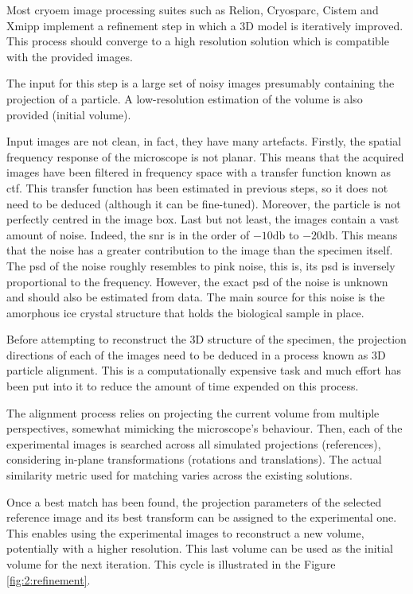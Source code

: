 \documentclass[../main.tex]{subfiles}
\begin{document}
Most \gls{cryoem} image processing suites such as Relion\cite{scheres2021}, Cryosparc\cite{cryosparc}, Cistem\cite{grigorieff2018} and Xmipp\cite{sorzano2021} implement a refinement step in which a 3D model is iteratively improved. This process should converge to a high resolution solution which is compatible with the provided images. 

The input for this step is a large set of noisy images presumably containing the projection of a particle. A low-resolution estimation of the volume is also provided (initial volume)\cite{sorzano2017b}.

Input images are not clean, in fact, they have many artefacts. Firstly, the spatial frequency response of the microscope is not planar. This means that the acquired images have been filtered in frequency space with a transfer function known as \gls{ctf}. This transfer function has been estimated in previous steps, so it does not need to be deduced (although it can be fine-tuned). Moreover, the particle is not perfectly centred in the image box. Last but not least, the images contain a vast amount of noise. Indeed, the \gls{snr} is in the order of $-10 \si{\decibel}$ to $-20 \si{\decibel}$\cite{sorzano2022}. This means that the noise has a greater contribution to the image than the specimen itself. The \gls{psd} of the noise roughly resembles to pink noise, this is, its \gls{psd} is inversely proportional to the frequency. However, the exact \gls{psd} of the noise is unknown and should also be estimated from data\cite{unser2005}. The main source for this noise is the amorphous ice crystal structure that holds the biological sample in place.

Before attempting to reconstruct the 3D structure of the specimen, the projection directions of each of the images need to be deduced in a process known as 3D particle alignment\cite{sorzano2017b}. This is a computationally expensive task and much effort has been put into it to reduce the amount of time expended on this process. 

The alignment process relies on projecting the current volume from multiple perspectives, somewhat mimicking the microscope's behaviour. Then, each of the experimental images is searched across all simulated projections (references), considering in-plane transformations (rotations and translations). The actual similarity metric used for matching varies across the existing solutions\cite{sorzano2017b}. 

Once a best match has been found, the projection parameters of the selected reference image and its best transform can be assigned to the experimental one. This enables using the experimental images to reconstruct a new volume, potentially with a higher resolution. This last volume can be used as the initial volume for the next iteration. This cycle is illustrated in the Figure \ref{fig:2:refinement}. 
\end{document}
